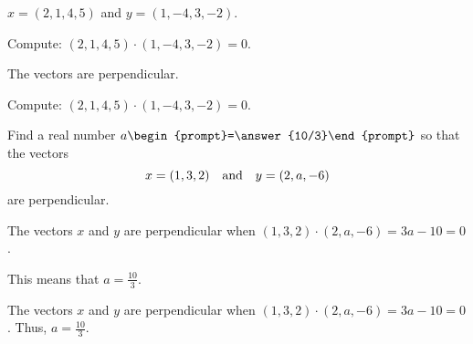 \documentclass{ximera}
\begin{document}
\begin{exercise} \label{c1.4.1c}
  $x=(2,1,4,5)$ and $y=(1,-4,3,-2)$.
    \begin{multipleChoice}
  \end{multipleChoice}
  \begin{hint}
    Compute: $(2,1,4,5) \cdot (1,-4,3,-2) = 0$.
  \end{hint}

\begin{solution}
\ans The vectors are perpendicular.

\soln Compute: $(2,1,4,5) \cdot (1,-4,3,-2) = 0$.

\end{solution}
\end{exercise}


\begin{exercise} \label{c1.4.2}
Find a real number $a\begin{prompt}=\answer{10/3}\end{prompt}$ so that the vectors
\[
x = (1,3,2) \quad\mbox{and}\quad y = (2,a,-6)
\]
are perpendicular.
\begin{hint}
  The vectors $x$ and $y$ are perpendicular when
$(1,3,2) \cdot (2,a,-6) = 3a - 10 = 0$.
\end{hint}
\begin{hint}
  This means that $a = \frac{10}{3}$.
\end{hint}

\begin{solution}

The vectors $x$ and $y$ are perpendicular when $(1,3,2) \cdot (2,a,-6) = 3a - 10 = 0$.  Thus, $a = \frac{10}{3}$.

\end{solution}
\end{exercise}
\end{document}
